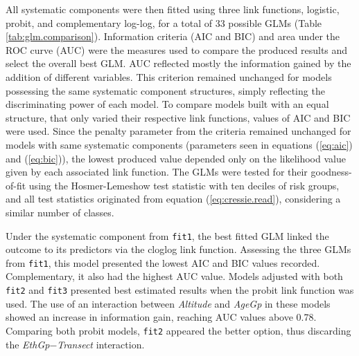 All systematic components were then fitted using three link functions, logistic, probit, and complementary log-log, for a total of 33 possible GLMs (Table \ref{tab:glm.comparison}).
Information criteria (AIC and BIC) and area under the ROC curve (AUC) were the measures used to compare the produced results and select the overall best GLM.
AUC reflected mostly the information gained by the addition of different variables.
This criterion remained unchanged for models possessing the same systematic component structures, simply reflecting the discriminating power of each model.
To compare models built with an equal structure, that only varied their respective link functions, values of AIC and BIC were used.
Since the penalty parameter from the criteria remained unchanged for models with same systematic components (parameters seen in equations (\ref{eq:aic}) and (\ref{eq:bic})), the lowest produced value depended only on the likelihood value given by each associated link function.
The GLMs were tested for their goodness-of-fit using the Hosmer-Lemeshow test statistic with ten deciles of risk groups, and all test statistics originated from equation (\ref{eq:cressie.read}), considering a similar number of classes.
\newpage

Under the systematic component from \texttt{fit1}, the best fitted GLM linked the outcome to its predictors via the cloglog link function.
Assessing the three GLMs from \texttt{fit1}, this model presented the lowest AIC and BIC values recorded.
Complementary, it also had the highest AUC value.
Models adjusted with both \texttt{fit2} and \texttt{fit3} presented best estimated results when the probit link function was used.
The use of an interaction between \textit{Altitude} and \textit{AgeGp} in these models showed an increase in information gain, reaching AUC values above 0.78.
Comparing both probit models, \texttt{fit2} appeared the better option, thus discarding the \textit{EthGp}$-$\textit{Transect} interaction.

